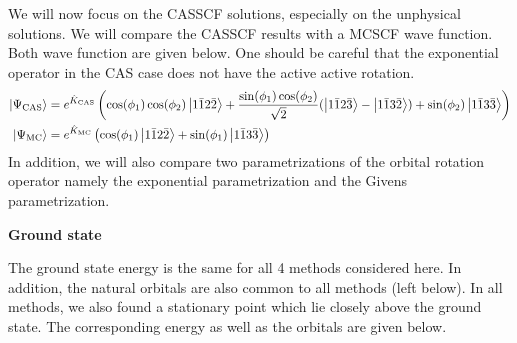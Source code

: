 \documentclass[11pt,a4paper]{article}
\newcommand{\hK}{\Hat{K}} %
\begin{document}
We will now focus on the CASSCF solutions, especially on the unphysical solutions. We will compare the CASSCF results with a MCSCF wave function. Both wave function are given below. One should be careful that the exponential operator in the CAS case does not have the active active rotation.
\begin{align}
  \ket{\Psi_\text{CAS}} &= e^{\hK_\text{CAS}}\left(\cos(\phi_1)\cos(\phi_2)\ket{1\bar{1}2\bar{2}} + \frac{\sin(\phi_1)\cos(\phi_2)}{\sqrt{2}}(\ket{1\bar{1}2\bar{3}}-\ket{1\bar{1}3\bar{2}}) + \sin(\phi_2)\ket{1\bar{1}3\bar{3}}\right) \\
  \ket{\Psi_\text{MC}} &= e^{\hK_{\text{MC}}}\left(\cos(\phi_1)\ket{1\bar{1}2\bar{2}} + \sin(\phi_1)\ket{1\bar{1}3\bar{3}}\right)
\end{align}
In addition, we will also compare two parametrizations of the orbital rotation operator namely the exponential parametrization and the Givens parametrization.

\textbf{Ground state}

The ground state energy is the same for all 4 methods considered here. In addition, the natural orbitals are also common to all methods (left below).
In all methods, we also found a stationary point which lie closely above the ground state. The corresponding energy as well as the orbitals are given below.
\end{document}
